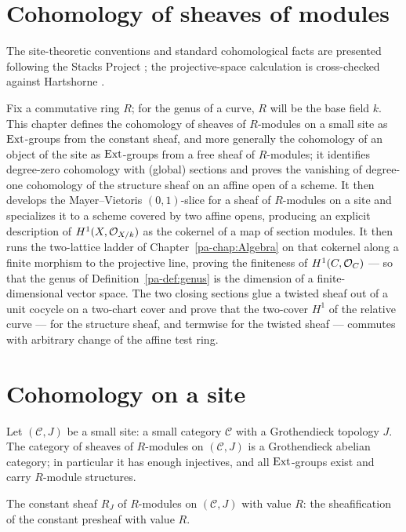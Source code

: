 \section{Cohomology of sheaves of modules}
\label{pa-chap:Cohomology}

The site-theoretic conventions and standard cohomological facts are presented following
the Stacks Project \cite{stacks-project}; the projective-space calculation is cross-checked
against Hartshorne \cite{hartshorne-ag}.

Fix a commutative ring \(R\); for the genus of a curve, \(R\) will be the base field \(k\).
This chapter defines the cohomology of sheaves of \(R\)-modules on a small site as
\(\operatorname{Ext}\)-groups from the constant sheaf, and more generally the cohomology of an object of
the site as \(\operatorname{Ext}\)-groups from a free sheaf of \(R\)-modules; it identifies degree-zero
cohomology with (global) sections and proves the vanishing of degree-one cohomology of the
structure sheaf on an affine open of a scheme. It then develops the Mayer--Vietoris
\((0,1)\)-slice for a sheaf of \(R\)-modules on a site and specializes it to a scheme
covered by two affine opens, producing an explicit description of \(H^1(X,\mathcal{O}_{X/k})\)
as the cokernel of a map of section modules. It then runs the
two-lattice ladder of Chapter~\ref{pa-chap:Algebra} on that cokernel along a finite morphism
to the projective line, proving the finiteness of \(H^1(C, \mathcal{O}_{C})\) --- so that the
genus of Definition~\ref{pa-def:genus} is the dimension of a finite-dimensional vector space.
The two closing sections glue a twisted sheaf out of a unit cocycle on a two-chart cover
and prove that the two-cover \(H^1\) of the relative curve --- for the structure sheaf,
and termwise for the twisted sheaf --- commutes with arbitrary change of the affine test
ring.

\section{Cohomology on a site}

Let \((\mathcal C, J)\) be a small site: a small category \(\mathcal C\) with a Grothendieck
topology \(J\). The category of sheaves of \(R\)-modules on \((\mathcal C, J)\) is a
Grothendieck abelian category; in particular it has enough injectives, and all
\(\operatorname{Ext}\)-groups exist and carry \(R\)-module structures.

\begin{definition}
  \label{pa-def:constModuleSheaf}
  \leanok

  The constant sheaf \(R_J\) of \(R\)-modules on \((\mathcal C, J)\) with value \(R\): the
  sheafification of the constant presheaf with value \(R\).
\end{definition}

